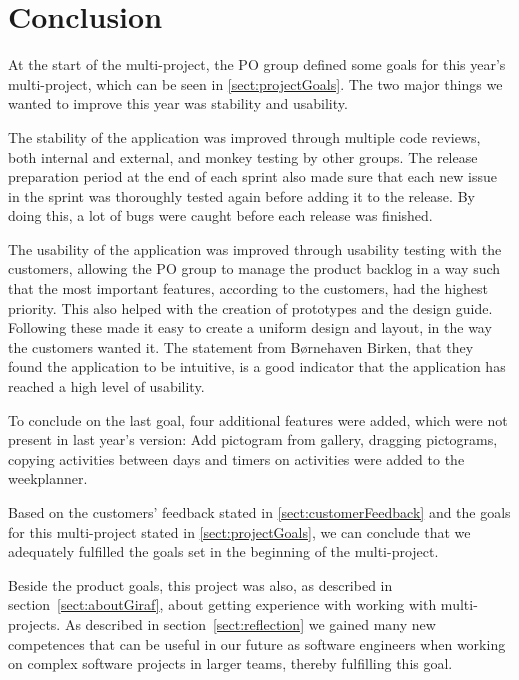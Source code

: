 \chapter{Conclusion}\label{ch:conclusion}
At the start of the multi-project, the PO group defined some goals for this year's multi-project, which can be seen in \ref{sect:projectGoals}. The two major things we wanted to improve this year was stability and usability.

The stability of the application was improved through multiple code reviews, both internal and external, and monkey testing by other groups. The release preparation period at the end of each sprint also made sure that each new issue in the sprint was thoroughly tested again before adding it to the release. By doing this, a lot of bugs were caught before each release was finished. 

The usability of the application was improved through usability testing with the customers, allowing the PO group to manage the product backlog in a way such that the most important features, according to the customers, had the highest priority.
This also helped with the creation of prototypes and the design guide. Following these made it easy to create a uniform design and layout, in the way the customers wanted it.
The statement from Børnehaven Birken, that they found the application to be intuitive, is a good indicator that the application has reached a high level of usability.


To conclude on the last goal, four additional features were added, which were not present in last year's version: Add pictogram from gallery, dragging pictograms, copying activities between days and timers on activities were added to the weekplanner.

Based on the customers' feedback stated in \ref{sect:customerFeedback} and the goals for this multi-project stated in \ref{sect:projectGoals}, we can conclude that we adequately fulfilled the goals set in the beginning of the multi-project.

Beside the product goals, this project was also, as described in section~\ref{sect:aboutGiraf}, about getting experience with working with multi-projects. As described in section~\ref{sect:reflection} we gained many new competences that can be useful in our future as software engineers when working on complex software projects in larger teams, thereby fulfilling this goal. 